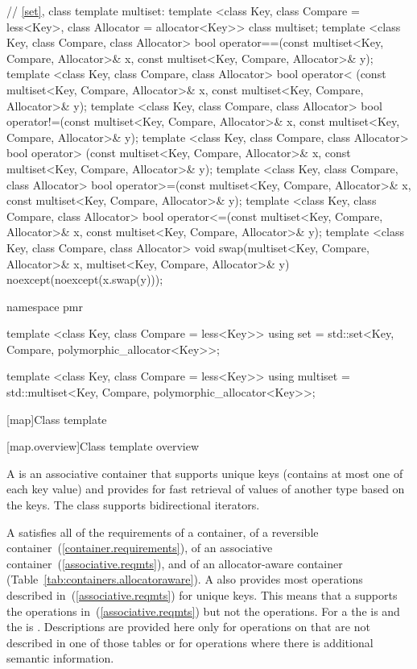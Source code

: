 \begin{codeblock}
{  // \ref{set}, class template multiset:
  template <class Key, class Compare = less<Key>,
            class Allocator = allocator<Key>>
    class multiset;
  template <class Key, class Compare, class Allocator>
    bool operator==(const multiset<Key, Compare, Allocator>& x,
                    const multiset<Key, Compare, Allocator>& y);
  template <class Key, class Compare, class Allocator>
    bool operator< (const multiset<Key, Compare, Allocator>& x,
                    const multiset<Key, Compare, Allocator>& y);
  template <class Key, class Compare, class Allocator>
    bool operator!=(const multiset<Key, Compare, Allocator>& x,
                    const multiset<Key, Compare, Allocator>& y);
  template <class Key, class Compare, class Allocator>
    bool operator> (const multiset<Key, Compare, Allocator>& x,
                    const multiset<Key, Compare, Allocator>& y);
  template <class Key, class Compare, class Allocator>
    bool operator>=(const multiset<Key, Compare, Allocator>& x,
                    const multiset<Key, Compare, Allocator>& y);
  template <class Key, class Compare, class Allocator>
    bool operator<=(const multiset<Key, Compare, Allocator>& x,
                    const multiset<Key, Compare, Allocator>& y);
  template <class Key, class Compare, class Allocator>
    void swap(multiset<Key, Compare, Allocator>& x,
              multiset<Key, Compare, Allocator>& y)
      noexcept(noexcept(x.swap(y)));

  namespace pmr {
    template <class Key, class Compare = less<Key>>
      using set = std::set<Key, Compare,
                           polymorphic_allocator<Key>>;

    template <class Key, class Compare = less<Key>>
      using multiset = std::multiset<Key, Compare,
                                     polymorphic_allocator<Key>>;
  }
}
\end{codeblock}

[map]{Class template }

[map.overview]{Class template  overview}

%
\pnum
A  is an associative container that
supports unique keys (contains at most one of each key value) and
provides for fast retrieval of values of another type  based
on the keys. The  class supports bidirectional iterators.

\pnum
A
satisfies all of the requirements of a container, of a reversible container~(\ref{container.requirements}), of
an associative container~(\ref{associative.reqmts}), and of an allocator-aware container (Table~\ref{tab:containers.allocatoraware}).
A
also provides most operations described in~(\ref{associative.reqmts})
for unique keys.
This means that a
supports the
operations in~(\ref{associative.reqmts})
but not the
operations.
For a
the
is
and the
is
.
Descriptions are provided here only for operations on
that are not described in one of those tables
or for operations where there is additional semantic information.

